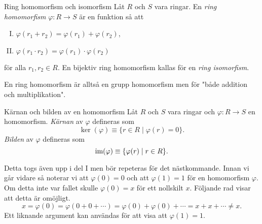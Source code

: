 \documentclass{article}
\newcommand{\im}[0]{\textnormal{im}}
\theoremstyle{definition}
\begin{document}
\begin{mydef}{Ring homomorfism och isomorfism}{}
  Låt $R$ och $S$ vara ringar. En \textit{ring homomorfism} $\varphi: R \rightarrow S$ är en funktion så att 
  \begin{enumerate}[I)]
    \item $\varphi(r_1 + r_2) = \varphi(r_1) + \varphi(r_2)$,
    \item $\varphi(r_1 \cdot r_2) = \varphi(r_1) \cdot \varphi(r_2)$
  \end{enumerate}
  för alla $r_1, r_2 \in R$. En bijektiv ring homomorfism kallas för en \textit{ring isomorfism}.
\end{mydef}
En ring homomorfism är alltså en grupp homomorfism men för "både addition och multiplikation".

\begin{mydef}{Kärnan och bilden av en homomorfism}{}
  Låt $R$ och $S$ vara ringar och $\varphi: R \rightarrow S$ en homomorfism. \textit{Kärnan} av $\varphi$
  defineras som 
  \[\ker(\varphi) \equiv \{r \in R \; | \; \varphi(r) = 0\}.\]
  \textit{Bilden} av $\varphi$ defineras som 
  \[\im(\varphi) \equiv \{\varphi(r) \; | \; r \in R\}.\]
\end{mydef}
Detta togs även upp i del I men bör repeteras för det nästkommande. Innan vi går vidare 
så noterar vi att $\varphi(0) = 0$ och att $\varphi(1) = 1$ för en homomorfism $\varphi$. Om detta inte var fallet skulle $\varphi(0) = x$ för ett nollskilt $x$. 
Följande rad visar att detta är omöjligt.
\[x = \varphi(0) = \varphi(0 + 0 + \cdots) = \varphi(0) + \varphi(0) + \cdots =  x + x + \cdots \neq x.\]
Ett liknande argument kan användas för att visa att $\varphi(1) = 1$.
\end{document}
